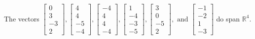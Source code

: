 \begin{exercise}
\begin{exerciseStatement}
  \end{exerciseStatement}
  \begin{exerciseAnswer}
   The vectors \(\left[\begin{array}{r}
0 \\
3 \\
-3 \\
2
\end{array}\right] , \left[\begin{array}{r}
4 \\
4 \\
-5 \\
-4
\end{array}\right] , \left[\begin{array}{r}
-4 \\
4 \\
4 \\
-4
\end{array}\right] , \left[\begin{array}{r}
1 \\
-4 \\
-3 \\
-5
\end{array}\right] , \left[\begin{array}{r}
3 \\
0 \\
-5 \\
2
\end{array}\right] , \text{ and } \left[\begin{array}{r}
-1 \\
-2 \\
1 \\
-3
\end{array}\right]\) 
  	 do  
	span \(\mathbb{R}^4\).
  


  \end{exerciseAnswer}
\end{exercise}
